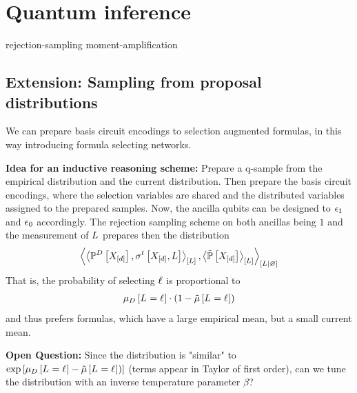 \chapter{Quantum inference}



{rejection-sampling}
{moment-amplification}

\section{Extension: Sampling from proposal distributions}

We can prepare basis circuit encodings to selection augmented formulas, in this way introducing formula selecting networks.

\textbf{Idea for an inductive reasoning scheme:} Prepare a q-sample from the empirical distribution and the current distribution.
Then prepare the basis circuit encodings, where the selection variables are shared and the distributed variables assigned to the prepared samples.
Now, the ancilla qubits can be designed to $\epsilon_{1}$ and $\epsilon_{0}$ accordingly.
The rejection sampling scheme on both ancillas being $1$ and the measurement of $L$ prepares then the distribution
\begin{align*}
    \left\langle 
        \left\langle \mathbb{P}^{D}\left[X_{[d]}\right], \sigma^{t}\left[X_{[d]},L\right]\right\rangle_{\left[ L \right]}, \left\langle \tilde{\mathbb{P}}\left[X_{[d]}\right]\right\rangle_{\left[ L \right]}
    \right\rangle_{\left[ L | \varnothing \right]}
\end{align*}
That is, the probability of selecting $\ell$ is proportional to
\begin{align*}
    \mu_{D}\left[L_{}=\ell_{}\right] \cdot (1-\tilde{\mu}\left[L_{}=\ell_{}\right])
\end{align*}
and thus prefers formulas, which have a large empirical mean, but a small current mean.

\textbf{Open Question:} Since the distribution is "similar" to $\mathrm{exp}\left[\mu_{D}\left[L_{}=\ell_{}\right]-\tilde{\mu}\left[L_{}=\ell_{}\right])\right]$ (terms appear in Taylor of first order), can we tune the distribution with an inverse temperature parameter $\beta$?


